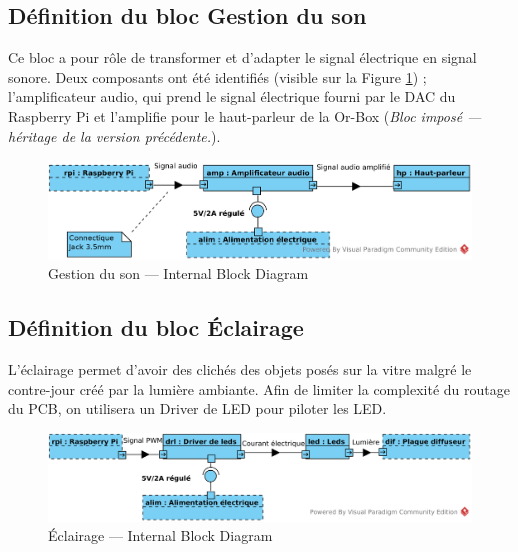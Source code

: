 
\subsection{Définition du bloc Gestion du son}
\label{sub:DefSon}

Ce bloc a pour rôle de transformer et d'adapter le signal électrique en signal sonore.
Deux composants ont été identifiés (visible sur la Figure \ref{SonIBD}) ; l'amplificateur audio, qui prend le signal électrique fourni par le DAC du Raspberry Pi et l'amplifie pour le haut-parleur de la Or-Box (\emph{Bloc imposé --- héritage de la version précédente.}). 

\begin{figure}[H]
	\centerline{
		\includegraphics[scale=0.75]{img/SysML_Son_IBD.png}
	}
	\caption{Gestion du son --- Internal Block Diagram}
	\label{SonIBD}
\end{figure}


\subsection{Définition du bloc Éclairage}
\label{sub:DefEclairage}

L'éclairage permet d'avoir des clichés des objets posés sur la vitre malgré le contre-jour créé par la lumière ambiante.
Afin de limiter la complexité du routage du PCB, on utilisera un Driver de LED pour piloter les LED.

\begin{figure}[H]
	\centerline{
		\includegraphics[scale=0.75]{img/SysML_Lum_IBD.png}
	}
	\caption{Éclairage --- Internal Block Diagram}
	\label{LumIBD}
\end{figure}




